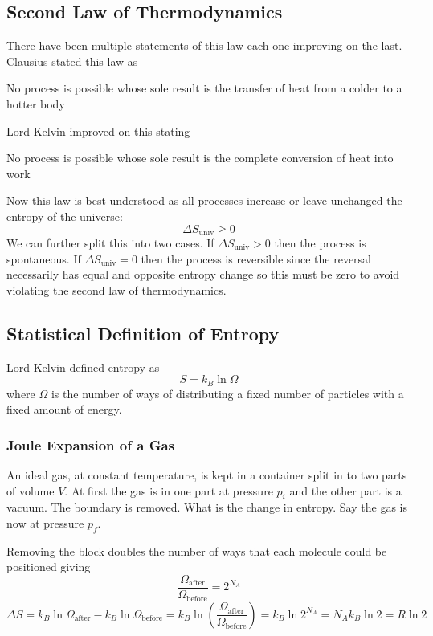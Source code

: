 \documentclass{article}
\begin{document}
    \subsection{Second Law of Thermodynamics}
    There have been multiple statements of this law each one improving on the last.
    Clausius stated this law as
    \begin{displayquote}
        No process is possible whose sole result is the transfer of heat from a colder to a hotter body
    \end{displayquote}
    Lord Kelvin improved on this stating
    \begin{displayquote}
        No process is possible whose sole result is the complete conversion of heat into work
    \end{displayquote}
    Now this law is best understood as all processes increase or leave unchanged the entropy of the universe:
    \[\Delta S_\text{univ} \ge 0\]
    We can further split this into two cases.
    If \(\Delta S_\text{univ} > 0\) then the process is spontaneous.
    If \(\Delta S_\text{univ} = 0\) then the process is reversible since the reversal necessarily has equal and opposite entropy change so this must be zero to avoid violating the second law of thermodynamics.
    
    \subsection{Statistical Definition of Entropy}
    Lord Kelvin defined entropy as
    \[S = k_B\ln\Omega\]
    where \(\Omega\) is the number of ways of distributing a fixed number of particles with a fixed amount of energy.
    
    \subsubsection{Joule Expansion of a Gas}
    An ideal gas, at constant temperature, is kept in a container split in to two parts of volume \(V\).
    At first the gas is in one part at pressure \(p_i\) and the other part is a vacuum.
    The boundary is removed.
    What is the change in entropy.
    Say the gas is now at pressure \(p_f\).
    
    Removing the block doubles the number of ways that each molecule could be positioned giving
    \[\frac{\Omega_\text{after}}{\Omega_\text{before}} = 2^{N_A}\]
    \[\Delta S = k_B\ln \Omega_\text{after} - k_B\ln \Omega_\text{before} = k_B\ln\left(\frac{\Omega_\text{after}}{\Omega_\text{before}}\right) = k_B\ln 2^{N_A} = N_Ak_B\ln 2 = R\ln 2\]
    
\end{document}
